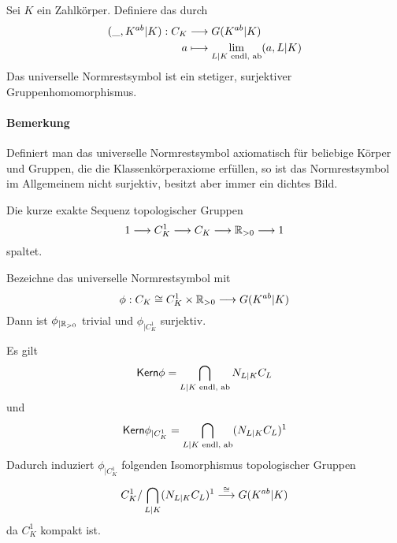 \documentclass{book}
\begin{document}
Sei $K$ ein Zahlkörper. Definiere das  durch
\begin{align*}
(\_, K^{ab} | K)  : C_K& \overset{}{\longrightarrow} G(K^{ab}|K) \\
a & \longmapsto  \lim\limits_{L|K \text{ endl, ab}}(a, L|K)
\end{align*}
Das universelle Normrestsymbol ist ein stetiger, surjektiver Gruppenhomomorphismus.
\paragraph{Bemerkung} Definiert man das universelle Normrestsymbol axiomatisch für beliebige Körper und Gruppen, die die Klassenkörperaxiome erfüllen, so ist das Normrestsymbol im Allgemeinem nicht surjektiv, besitzt aber immer ein dichtes Bild.

\Prop{}
Die kurze exakte Sequenz topologischer Gruppen
\[ 1 \overset{}{\longrightarrow} C_K^1 \overset{}{\longrightarrow} C_K \overset{}{\longrightarrow} \mathbb{R}_{> 0} \overset{}{\longrightarrow} 1 \]
spaltet.

\Lem{}
Bezeichne das universelle Normrestsymbol mit
\[ \phi : C_K \overset{}{\cong} C_K^1 \times \mathbb{R}_{>0} \overset{}{\longrightarrow} G(K^{ab}|K) \]
Dann ist $\phi_{|\mathbb{R}_{>0}}$ trivial und $\phi_{|C_K^1}$ surjektiv.

\Bem{}
Es gilt
\[ \textsf{Kern} \phi = \bigcap_{L|K \text{ endl, ab}}N_{L|K}C_L \]
und
\[ \textsf{Kern} \phi_{|C_K^1} = \bigcap_{L|K \text{ endl, ab}}(N_{L|K}C_L)^1 \]
Dadurch induziert $\phi_{|C_K^1}$ folgenden Isomorphismus topologischer Gruppen
\[ C_K^1/\bigcap_{L|K}(N_{L|K}C_L)^1 \overset{\overset{}{\cong}}{\longrightarrow} G(K^{ab}|K) \]
da $C_K^1$ kompakt ist.
\printindex
\end{document}
